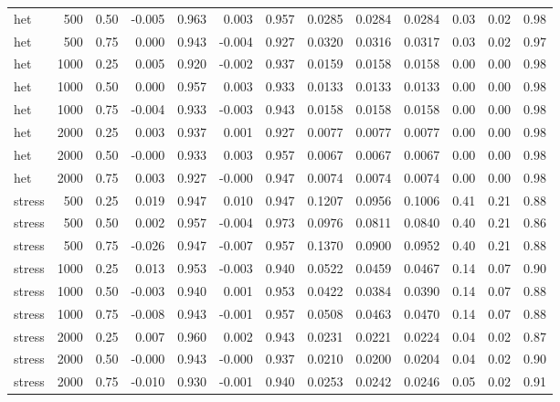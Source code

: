 \begin{table}[t]
\begin{tabular}{lrr rr rr rrr rr r}
het & 500 & 0.50 & -0.005 & 0.963 & 0.003 & 0.957 & 0.0285 & 0.0284 & 0.0284 & 0.03 & 0.02 & 0.98 \\
het & 500 & 0.75 & 0.000 & 0.943 & -0.004 & 0.927 & 0.0320 & 0.0316 & 0.0317 & 0.03 & 0.02 & 0.97 \\
\addlinespace
het & 1000 & 0.25 & 0.005 & 0.920 & -0.002 & 0.937 & 0.0159 & 0.0158 & 0.0158 & 0.00 & 0.00 & 0.98 \\
het & 1000 & 0.50 & 0.000 & 0.957 & 0.003 & 0.933 & 0.0133 & 0.0133 & 0.0133 & 0.00 & 0.00 & 0.98 \\
het & 1000 & 0.75 & -0.004 & 0.933 & -0.003 & 0.943 & 0.0158 & 0.0158 & 0.0158 & 0.00 & 0.00 & 0.98 \\
\addlinespace
het & 2000 & 0.25 & 0.003 & 0.937 & 0.001 & 0.927 & 0.0077 & 0.0077 & 0.0077 & 0.00 & 0.00 & 0.98 \\
het & 2000 & 0.50 & -0.000 & 0.933 & 0.003 & 0.957 & 0.0067 & 0.0067 & 0.0067 & 0.00 & 0.00 & 0.98 \\
het & 2000 & 0.75 & 0.003 & 0.927 & -0.000 & 0.947 & 0.0074 & 0.0074 & 0.0074 & 0.00 & 0.00 & 0.98 \\
\addlinespace
stress & 500 & 0.25 & 0.019 & 0.947 & 0.010 & 0.947 & 0.1207 & 0.0956 & 0.1006 & 0.41 & 0.21 & 0.88 \\
stress & 500 & 0.50 & 0.002 & 0.957 & -0.004 & 0.973 & 0.0976 & 0.0811 & 0.0840 & 0.40 & 0.21 & 0.86 \\
stress & 500 & 0.75 & -0.026 & 0.947 & -0.007 & 0.957 & 0.1370 & 0.0900 & 0.0952 & 0.40 & 0.21 & 0.88 \\
\addlinespace
stress & 1000 & 0.25 & 0.013 & 0.953 & -0.003 & 0.940 & 0.0522 & 0.0459 & 0.0467 & 0.14 & 0.07 & 0.90 \\
stress & 1000 & 0.50 & -0.003 & 0.940 & 0.001 & 0.953 & 0.0422 & 0.0384 & 0.0390 & 0.14 & 0.07 & 0.88 \\
stress & 1000 & 0.75 & -0.008 & 0.943 & -0.001 & 0.957 & 0.0508 & 0.0463 & 0.0470 & 0.14 & 0.07 & 0.88 \\
\addlinespace
stress & 2000 & 0.25 & 0.007 & 0.960 & 0.002 & 0.943 & 0.0231 & 0.0221 & 0.0224 & 0.04 & 0.02 & 0.87 \\
stress & 2000 & 0.50 & -0.000 & 0.943 & -0.000 & 0.937 & 0.0210 & 0.0200 & 0.0204 & 0.04 & 0.02 & 0.90 \\
stress & 2000 & 0.75 & -0.010 & 0.930 & -0.001 & 0.940 & 0.0253 & 0.0242 & 0.0246 & 0.05 & 0.02 & 0.91 \\
\bottomrule\end{tabular}\end{table}
